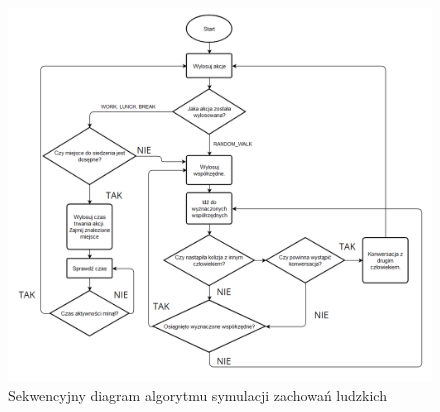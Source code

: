 \begin{figure}[h!]
	\includegraphics[width=\linewidth]{DiagramAlgorytmuZachowania.png}
	\caption{Sekwencyjny diagram algorytmu symulacji zachowań ludzkich}
\end{figure}




%     

%      


